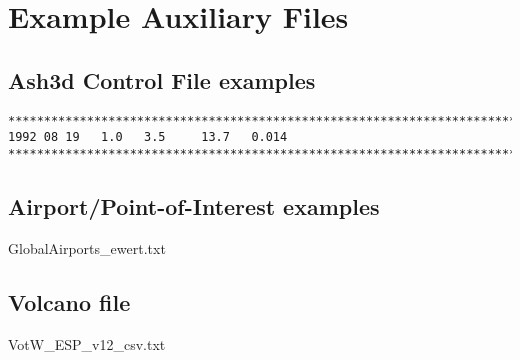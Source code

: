 \chapter{Example Auxiliary Files}\label{ChapAppendAuxFiles}
\section{Ash3d Control File examples}\label{ChapAppendSecInputFile}
\small
\begin{verbatim}
*******************************************************************************
1992 08 19   1.0   3.5     13.7   0.014
*******************************************************************************
\end{verbatim}
\normalsize

\section{Airport/Point-of-Interest examples}\label{ChapAppendSecPOI}
GlobalAirports\_ewert.txt

\section{Volcano file}
VotW\_ESP\_v12\_csv.txt


